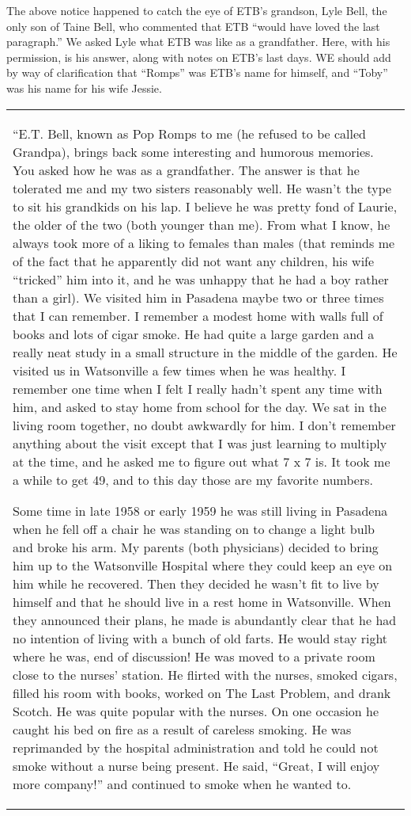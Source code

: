 \documentclass[10pt,letter]{article}
\renewenvironment{quote}
  {\begin{tabular}{|p{13cm}}}
  {\end{tabular}}
\begin{document}
The above notice happened to catch the eye of ETB's grandson, Lyle Bell,
the only son of Taine Bell, who commented that ETB ``would have loved
the last paragraph.'' We asked Lyle what ETB was like as a grandfather.
Here, with his permission, is his answer, along with notes on ETB's last
days. WE should add by way of clarification that ``Romps'' was ETB's
name for himself, and ``Toby'' was his name for his wife Jessie.
\begin{quote}
``E.T. Bell, known as Pop Romps to me (he refused to be called Grandpa),
brings back some interesting and humorous memories. You asked how he was
as a grandfather. The answer is that he tolerated me and my two sisters
reasonably well. He wasn't the type to sit his grandkids on his lap. I
believe he was pretty fond of Laurie, the older of the two (both younger
than me). From what I know, he always took more of a liking to females
than males (that reminds me of the fact that he apparently did not want
any children, his wife ``tricked'' him into it, and he was unhappy that
he had a boy rather than a girl). We visited him in Pasadena maybe two
or three times that I can remember. I remember a modest home with walls
full of books and lots of cigar smoke. He had quite a large garden and a
really neat study in a small structure in the middle of the garden. He
visited us in Watsonville a few times when he was healthy. I remember
one time when I felt I really hadn't spent any time with him, and asked
to stay home from school for the day. We sat in the living room
together, no doubt awkwardly for him. I don't remember anything about
the visit except that I was just learning to multiply at the time, and
he asked me to figure out what 7 x 7 is. It took me a while to get 49,
and to this day those are my favorite numbers.

Some time in late 1958 or early 1959 he was still living in Pasadena
when he fell off a chair he was standing on to change a light bulb and
broke his arm. My parents (both physicians) decided to bring him up to
the Watsonville Hospital where they could keep an eye on him while he
recovered. Then they decided he wasn't fit to live by himself and that
he should live in a rest home in Watsonville. When they announced their
plans, he made is abundantly clear that he had no intention of living
with a bunch of old farts. He would stay right where he was, end of
discussion! He was moved to a private room close to the nurses' station.
He flirted with the nurses, smoked cigars, filled his room with books,
worked on The Last Problem, and drank Scotch. He was quite popular with
the nurses. On one occasion he caught his bed on fire as a result of
careless smoking. He was reprimanded by the hospital administration and
told he could not smoke without a nurse being present. He said, ``Great,
I will enjoy more company!'' and continued to smoke when he wanted to.


\end{quote}
\end{document}
